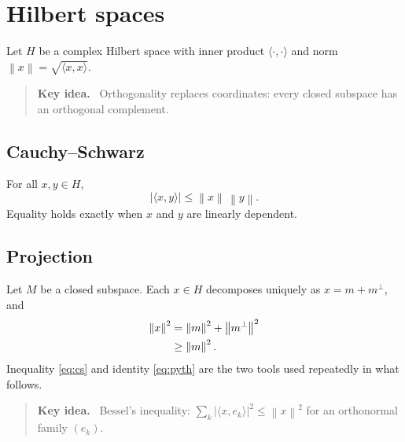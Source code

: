 \documentclass[11pt,letterpaper]{article}
\newenvironment{keyidea}{\begin{quote}\textbf{Key idea.}\ }{\end{quote}}
\newcommand{\norm}[1]{\left\lVert #1\right\rVert}
\begin{document}
\section{Hilbert spaces}
Let $H$ be a complex Hilbert space with inner product $\langle\cdot,\cdot\rangle$ and norm $\norm{x}=\sqrt{\langle x,x\rangle}$.

\begin{keyidea}
Orthogonality replaces coordinates: every closed subspace has an orthogonal complement.
\end{keyidea}

\subsection{Cauchy--Schwarz}
For all $x,y\in H$,
\begin{equation}\label{eq:cs}
|\langle x,y\rangle|\le\norm{x}\,\norm{y}.
\end{equation}
Equality holds exactly when $x$ and $y$ are linearly dependent.

\subsection{Projection}
Let $M$ be a closed subspace. Each $x\in H$ decomposes uniquely as $x=m+m^\perp$, and
\begin{align}
\norm{x}^2&=\norm{m}^2+\norm{m^\perp}^2 \label{eq:pyth}\\
&\ge\norm{m}^2.\notag
\end{align}
Inequality \eqref{eq:cs} and identity \eqref{eq:pyth} are the two tools used repeatedly in what follows.

\begin{keyidea}
Bessel's inequality: $\sum_k|\langle x,e_k\rangle|^2\le\norm{x}^2$ for an orthonormal family $(e_k)$.
\end{keyidea}
\end{document}
